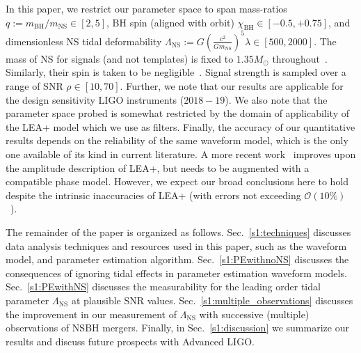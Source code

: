 \documentclass[aps,prd,amsmath,floats,floatfix, twocolumn,
superscriptaddress,nofootinbib,showpacs]{revtex4-1}
\newcommand{\prayush}{\textcolor{red!40!black}}
\newcommand{\lambdans}{\Lambda_\mathrm{NS}}
\newcommand{\chibh}{\chi_\mathrm{BH}}
\newcommand{\mbh}{m_\mathrm{BH}}
\newcommand{\mns}{m_\mathrm{NS}}
\begin{document}
In this paper, we restrict our parameter space to span mass-ratios
$q:=\mbh/\mns\in[2,5]$, BH spin (aligned with orbit)
$\chibh\in[-0.5, +0.75]$, and dimensionless NS tidal deformability 
$\lambdans:= G\left(\frac{c^2}{G \mns}\right)^5\lambda \in[500, 2000]$.
The mass of NS for signals (and not templates) is fixed to $1.35M_\odot$ 
throughout~\cite{stellarcollapsemass}. Similarly, their spin is taken to be
negligible~\cite{Miller:2014aaa}. Signal strength is sampled over a range of
SNR $\rho\in[10, 70]$.
% 
Further, we note that our results are applicable for the design sensitivity
LIGO instruments ($2018-19$). 
We also note that the parameter space probed is somewhat restricted by the
domain of applicability of the LEA+ model which we use as filters. Finally,
the accuracy of our quantitative results depends on the reliability of the same
waveform model, which is the only one available of its kind in current
literature. A more recent work~\cite{Pannarale:2015jka} improves upon the 
amplitude description of LEA+, but needs to be augmented with a compatible
phase model. However, we expect our broad conclusions here to hold despite
the intrinsic inaccuracies of LEA+ (with errors not exceeding
$\mathcal{O}(10\%)$~\cite{Pannarale:2015jka}).
% 



The remainder of the paper is organized as follows. 
Sec.~\ref{s1:techniques} discusses data analysis techniques and resources 
used in this paper, such as the waveform model, and parameter estimation 
algorithm.
Sec.~\ref{s1:PEwithnoNS} discusses the consequences of ignoring tidal 
effects in parameter estimation waveform models.
Sec.~\ref{s1:PEwithNS} discusses the measurability for the leading order
tidal parameter $\lambdans$ at plausible SNR values.
Sec.~\ref{s1:multiple_observations} discusses the improvement in our
measurement of $\lambdans$ with successive (multiple) observations of
NSBH mergers.
Finally, in Sec.~\ref{s1:discussion} we summarize our results and discuss
future prospects with Advanced LIGO.





\end{document}
